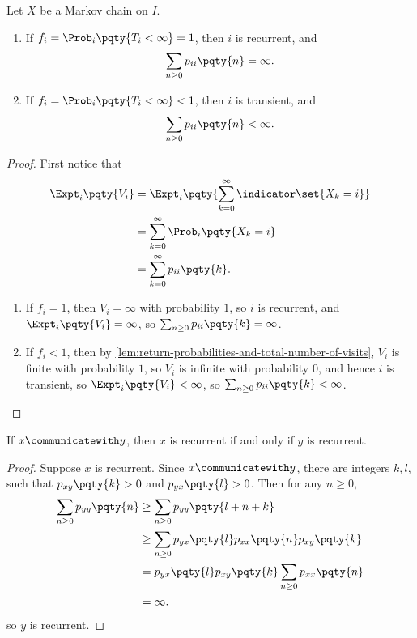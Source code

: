 \begin{theorem}
    Let \(X\) be a Markov chain on \(I\).

    \begin{enumerate}
        \item If \(f_i = \Prob_i \pqty{T_i < \infty} = 1\), then \(i\) is recurrent, and
        \[
            \sum_{n \geq 0} p_{ii} \pqty{n} = \infty.
        \]

        \item If \(f_i = \Prob_i \pqty{T_i < \infty} < 1\), then \(i\) is transient, and
        \[
            \sum_{n \geq 0} p_{ii} \pqty{n} < \infty.
        \]
    \end{enumerate}
\end{theorem}

\begin{proof}
    First notice that
    \begin{align*}
        \Expt_i \pqty{V_i} &= \Expt_i \pqty{\sum_{k = 0}^{\infty} \indicator \set{X_k = i}} \\
        &= \sum_{k = 0}^{\infty} \Prob_i \pqty{X_k = i} \\
        &= \sum_{k = 0}^{\infty} p_{ii} \pqty{k}.
    \end{align*}

    \begin{enumerate}
        \item If \(f_i = 1\), then \(V_i = \infty\) with probability \(1\), so \(i\) is recurrent, and \(\Expt_i \pqty{V_i} = \infty\), so \(\sum_{n \geq 0} p_{ii} \pqty{k} = \infty\).
        \item If \(f_i < 1\), then by \autoref{lem:return-probabilities-and-total-number-of-visits}, \(V_i\) is finite with probability \(1\), so \(V_i\) is infinite with probability \(0\), and hence \(i\) is transient, so \(\Expt_i \pqty{V_i} < \infty\), so \(\sum_{n \geq 0} p_{ii} \pqty{k} < \infty\).
    \end{enumerate}
\end{proof}

\begin{theorem}
    If \(x \communicatewith y\), then \(x\) is recurrent if and only if \(y\) is recurrent.
\end{theorem}

\begin{proof}
    Suppose \(x\) is recurrent. Since \(x \communicatewith y\), there are integers \(k, l\), such that \(p_{xy} \pqty{k} > 0\) and \(p_{yx} \pqty{l} > 0\). Then for any \(n \geq 0\),
    \begin{align*}
        \sum_{n \geq 0} p_{yy} \pqty{n} &\geq \sum_{n \geq 0} p_{yy} \pqty{l + n + k} \\
        &\geq \sum_{n \geq 0} p_{yx} \pqty{l} p_{xx} \pqty{n} p_{xy} \pqty{k} \\
        &= p_{yx} \pqty{l} p_{xy} \pqty{k} \sum_{n \geq 0} p_{xx} \pqty{n} \\
        &= \infty.
    \end{align*}
    so \(y\) is recurrent.
\end{proof}

